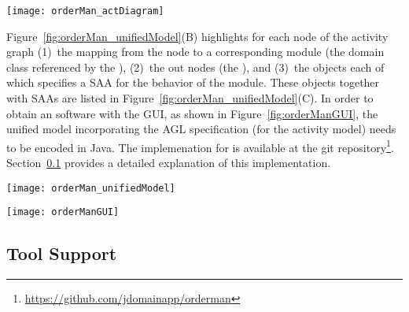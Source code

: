 \begin{figure*}[ht]
	\centering
	\texttt{[image: orderMan\_actDiagram]}
	\caption{The UML activity diagram for the process to handle orders, adapted from~\cite[p.~369]{omg_unified_2017}.} %
	\label{fig:orderMan_actDiagram}
\end{figure*}

Figure~\ref{fig:orderMan_unifiedModel}(B) highlights for each node of the activity graph (1)~the mapping from the node to a corresponding module (\wrt the domain class referenced by the ), (2)~the out nodes (\wrt the ), and (3)~the  objects each of which specifies a SAA for the behavior of the module. These  objects together with SAAs are listed in Figure~\ref{fig:orderMan_unifiedModel}(C). In order to obtain an \orderman software with the GUI, as shown in Figure~\ref{fig:orderManGUI}, %
the unified model incorporating the AGL specification (for the activity model) needs to be encoded in Java. The implemenation for \orderman is available at the git repository\footnote{\url{https://github.com/jdomainapp/orderman}}. Section~\ref{subsect:toolSupport} provides a detailed explanation of this implementation.
%
\begin{figure*}[ht]
	\centering
	\texttt{[image: orderMan\_unifiedModel]}
	\caption{(A: Left) The activity graph whose nodes are labeled with activity and component classes; (B: Top-right) The  objects; (C: Bottom-right)  objects that are referenced by the .} %
	\label{fig:orderMan_unifiedModel}
\end{figure*}

\begin{figure*}[ht]
	\centering
	\texttt{[image: orderManGUI]}
	\caption{The GUI of the \orderman~software generated by the tool.} %
	\label{fig:orderManGUI}
\end{figure*}

\subsection{Tool Support}
\label{subsect:toolSupport} %


